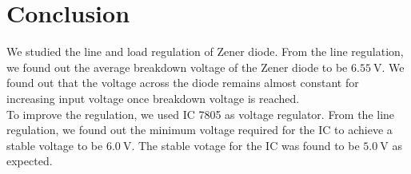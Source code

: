 \documentclass{scrartcl}
\begin{document}
\section{Conclusion}
We studied the line and load regulation of Zener diode. From the line regulation, we found out the average breakdown voltage of the Zener diode to be $\SI{6.55}{\volt}$. We found out that the voltage across the diode remains almost constant for increasing input voltage once breakdown voltage is reached. \\[0.3cm]
To improve the regulation, we used IC 7805 as voltage regulator. From the line regulation, we found out the minimum voltage required for the IC to achieve a stable voltage to be $\SI{6.0}{\volt}$. The stable votage for the IC was found to be $\SI{5.0}{\volt}$ as expected.  
\end{document}
